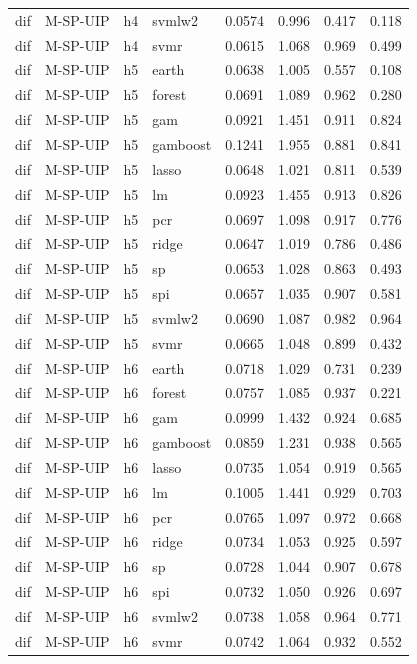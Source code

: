 \begin{ThreePartTable}
\begin{longtable}[t]{llclcccc}
dif & M-SP-UIP & h4 & svmlw2 & 0.0574 & 0.996 & 0.417 & 0.118\\
dif & M-SP-UIP & h4 & svmr & 0.0615 & 1.068 & 0.969 & 0.499\\
\addlinespace
dif & M-SP-UIP & h5 & earth & 0.0638 & 1.005 & 0.557 & 0.108\\
dif & M-SP-UIP & h5 & forest & 0.0691 & 1.089 & 0.962 & 0.280\\
dif & M-SP-UIP & h5 & gam & 0.0921 & 1.451 & 0.911 & 0.824\\
dif & M-SP-UIP & h5 & gamboost & 0.1241 & 1.955 & 0.881 & 0.841\\
dif & M-SP-UIP & h5 & lasso & 0.0648 & 1.021 & 0.811 & 0.539\\
dif & M-SP-UIP & h5 & lm & 0.0923 & 1.455 & 0.913 & 0.826\\
dif & M-SP-UIP & h5 & pcr & 0.0697 & 1.098 & 0.917 & 0.776\\
dif & M-SP-UIP & h5 & ridge & 0.0647 & 1.019 & 0.786 & 0.486\\
dif & M-SP-UIP & h5 & sp & 0.0653 & 1.028 & 0.863 & 0.493\\
dif & M-SP-UIP & h5 & spi & 0.0657 & 1.035 & 0.907 & 0.581\\
dif & M-SP-UIP & h5 & svmlw2 & 0.0690 & 1.087 & 0.982 & 0.964\\
dif & M-SP-UIP & h5 & svmr & 0.0665 & 1.048 & 0.899 & 0.432\\
\addlinespace
dif & M-SP-UIP & h6 & earth & 0.0718 & 1.029 & 0.731 & 0.239\\
dif & M-SP-UIP & h6 & forest & 0.0757 & 1.085 & 0.937 & 0.221\\
dif & M-SP-UIP & h6 & gam & 0.0999 & 1.432 & 0.924 & 0.685\\
dif & M-SP-UIP & h6 & gamboost & 0.0859 & 1.231 & 0.938 & 0.565\\
dif & M-SP-UIP & h6 & lasso & 0.0735 & 1.054 & 0.919 & 0.565\\
dif & M-SP-UIP & h6 & lm & 0.1005 & 1.441 & 0.929 & 0.703\\
dif & M-SP-UIP & h6 & pcr & 0.0765 & 1.097 & 0.972 & 0.668\\
dif & M-SP-UIP & h6 & ridge & 0.0734 & 1.053 & 0.925 & 0.597\\
dif & M-SP-UIP & h6 & sp & 0.0728 & 1.044 & 0.907 & 0.678\\
dif & M-SP-UIP & h6 & spi & 0.0732 & 1.050 & 0.926 & 0.697\\
dif & M-SP-UIP & h6 & svmlw2 & 0.0738 & 1.058 & 0.964 & 0.771\\
dif & M-SP-UIP & h6 & svmr & 0.0742 & 1.064 & 0.932 & 0.552\\

\end{longtable}
\end{ThreePartTable}
